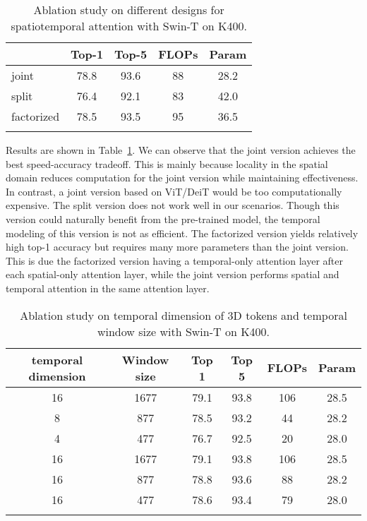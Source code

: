 \documentclass{article}
\begin{document}
\begin{table}[h]
\caption{Ablation study on different designs for spatiotemporal attention with Swin-T on K400.}
\centering
  \begin{tabular}{l|cc|cc}
  \Xhline{1.0pt}
   & Top-1 & Top-5 & FLOPs & Param  \\
  \hline
  joint  & 78.8 & 93.6 & 88 & 28.2 \\
  split & 76.4 & 92.1 & 83 & 42.0 \\
factorized & 78.5 & 93.5 & 95 & 36.5 \\
\Xhline{1.0pt}
  \end{tabular}
  \label{tab:variants}
\end{table}

Results are shown in Table~\ref{tab:variants}. We can observe that the joint version achieves the best speed-accuracy tradeoff. This is mainly because locality in the spatial domain reduces computation for the joint version while maintaining effectiveness. In contrast, a joint version based on ViT/DeiT would be too computationally expensive.
The split version does not work well in our scenarios. Though this version could naturally benefit from the pre-trained model, the temporal modeling of this version is not as efficient.
The factorized version yields relatively high top-1 accuracy but requires many more parameters than the joint version. This is due the factorized version having a temporal-only attention layer after each spatial-only attention layer, while the joint version performs spatial and temporal attention in the same attention layer.



\begin{table}[h]
\caption{Ablation study on temporal dimension of 3D tokens and temporal window size with Swin-T on K400.}
\centering
  \begin{tabular}{cc|cc|cc}
  \Xhline{1.0pt}
  temporal dimension & Window size & Top 1 & Top 5 & FLOPs & Param  \\
  \hline
  16 & 1677 & 79.1 & 93.8  & 106 & 28.5 \\
  8 & 877 & 78.5 & 93.2 & 44 & 28.2 \\
  4 & 477 & 76.7 & 92.5 & 20 & 28.0 \\
  \hline
  16 & 1677 & 79.1 & 93.8 & 106 & 28.5 \\
  16 & 877 & 78.8 & 93.6 & 88 & 28.2 \\
  16 & 477 & 78.6 & 93.4 & 79 & 28.0 \\

  \Xhline{1.0pt}
  \end{tabular}
  \label{tab:frame}
\end{table}
\end{document}
